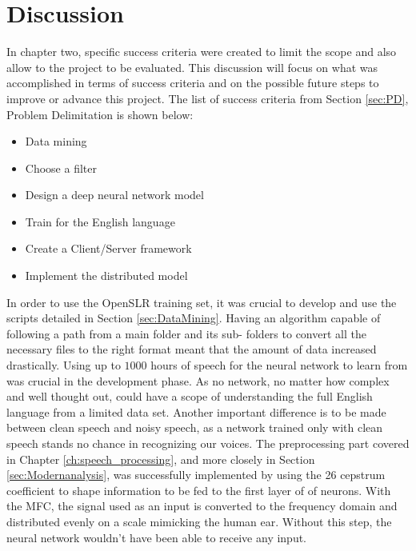 \chapter{Discussion}\label{ch:discussion}

In chapter two, specific success criteria were created to limit the scope and also allow to the project to be evaluated. This discussion will focus on what was accomplished in terms of success criteria and on the possible future steps to improve or advance this project. The list of success criteria from Section \ref{sec:PD}, Problem Delimitation is shown below:

\begin{itemize}
	\item Data mining
	\item Choose a filter
	\item Design a deep neural network model
	\item Train for the English language
	\item Create a Client/Server framework
	\item Implement the distributed model
\end{itemize} 

In order to use the OpenSLR training set, it was crucial to develop and use the 
scripts detailed in Section \ref{sec:DataMining}.
 Having an algorithm capable of following a path from a main folder and its sub-
 folders to convert all the necessary files to the right format meant that the 
 amount of data increased drastically.
  Using up to $1000$ hours of speech for the neural network to learn from was 
  crucial in the development phase. 
  As no network, no matter how complex and well thought out, could have a scope of 
  understanding the full English language from a limited data set. 
  Another important difference is to be made between clean speech and noisy speech, 
  as a network trained only with clean speech stands no chance in recognizing our 
  voices. 
  The preprocessing part covered in Chapter \ref{ch:speech_processing}, and more
   closely in Section \ref{sec:Modernanalysis}, was  successfully implemented by 
   using the 26 cepstrum coefficient to shape information to be fed to the first 
   layer of of neurons. With the MFC, the signal used as an input is converted to the frequency
   domain and distributed evenly on a scale mimicking the human ear. Without this step, the neural
   network wouldn't have been able to receive any input.\\
   
